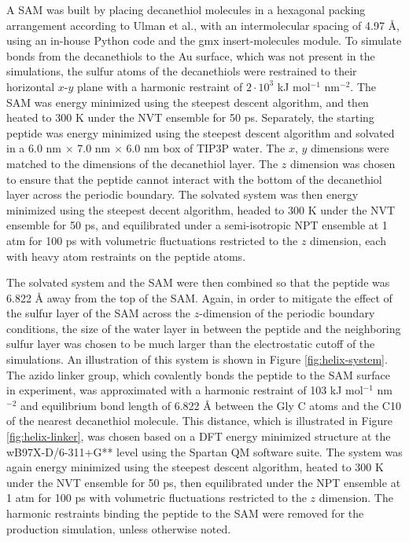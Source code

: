A SAM was built by placing decanethiol molecules in a hexagonal packing arrangement according to Ulman et al.\cite{Ulman1989}, with an intermolecular spacing of 4.97 \si{\angstrom}, using an in-house Python code and the gmx insert-molecules module. 
To simulate bonds from the decanethiols to the Au surface, which was not present in the simulations, the sulfur atoms of the decanethiols were restrained to their horizontal $x$-$y$ plane with a harmonic restraint of $2\cdot10^3$ kJ mol$^{-1}$ nm$^{-2}$. 
The SAM was energy minimized using the steepest descent algorithm, and then heated to 300 K under the NVT ensemble for 50 ps. 
Separately, the starting peptide was energy minimized using the steepest descent algorithm and solvated in a 6.0 nm $\times$ 7.0 nm $\times$ 6.0 nm box of TIP3P water. 
The $x$, $y$ dimensions were matched to the dimensions of the decanethiol layer. 
The $z$ dimension was chosen to ensure that the peptide cannot interact with the bottom of the decanethiol layer across the periodic boundary. 
The solvated system was then energy minimized using the steepest decent algorithm, headed to 300 K under the NVT ensemble for 50 ps, and equilibrated under a semi-isotropic NPT ensemble at 1 atm for 100 ps with volumetric fluctuations restricted to the $z$ dimension, each with heavy atom restraints on the peptide atoms. 

The solvated system and the SAM were then combined so that the peptide was 6.822 \si{\angstrom} away from the top of the SAM. 
Again, in order to mitigate the effect of the sulfur layer of the SAM across the $z$-dimension of the periodic boundary conditions, the size of the water layer in between the peptide and the neighboring sulfur layer was chosen to be much larger than the electrostatic cutoff of the simulations. 
An illustration of this system is shown in Figure \ref{fig:helix-system}. 
The azido linker group, which covalently bonds the peptide to the SAM surface in experiment, was approximated with a harmonic restraint of 103 kJ mol$^{-1}$ nm$^{-2}$ and equilibrium bond length of 6.822 \si{\angstrom} between the Gly C\textalpha{} atoms and the C10 of the nearest decanethiol molecule. 
This distance, which is illustrated in Figure \ref{fig:helix-linker}, was chosen based on a DFT energy minimized structure at the wB97X-D/6-311$+$G** level using the Spartan QM software suite\cite{Shao2006}.   
The system was again energy minimized using the steepest descent algorithm, heated to 300 K under the NVT ensemble for 50 ps, then equilibrated under the NPT ensemble at 1 atm for 100 ps with volumetric fluctuations restricted to the $z$ dimension. 
The harmonic restraints binding the peptide to the SAM were removed for the production simulation, unless otherwise noted.

